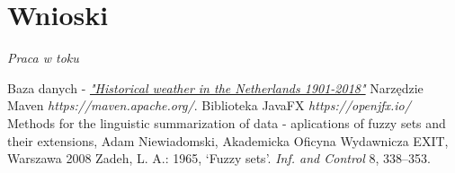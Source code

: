 \documentclass{classrep}
\begin{document}
\section{Wnioski}
\textit{Praca w toku}


\begin{thebibliography}{5}
Baza danych - 
\href{https://www.kaggle.com/sinaasappel/historical-weather-in-the-netherlands-19012018}{\textit{"Historical weather in the Netherlands 1901-2018"}}
Narzędzie Maven\newline
\textit{https://maven.apache.org/}. 
Biblioteka JavaFX\newline
\textit{https://openjfx.io/}
Methods for the linguistic summarization of data - aplications of fuzzy sets and their extensions, Adam Niewiadomski, Akademicka Oficyna Wydawnicza EXIT, Warszawa 2008
Zadeh, L. A.: 1965, ‘Fuzzy sets’.  \textit{Inf. and Control} 8, 338–353.
\end{thebibliography}
\end{document}
